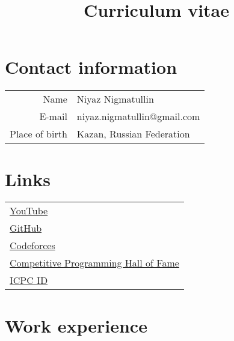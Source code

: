 \documentclass[11pt,a4paper,oneside]{article}
\begin{document}
\title{Curriculum vitae}
\date{}        
\maketitle

\section{Contact information}
\begin{center}
\begin{tabular}{r|l}
    Name&Niyaz Nigmatullin \\
    E-mail&niyaz.nigmatullin@gmail.com \\
    Place of birth&Kazan, Russian Federation \\
\end{tabular}
\end{center}

\section{Links}
\begin{center}
    \begin{tabular}{l}
        \href{https://www.youtube.com/c/NiyazNigmatullin}{YouTube} \\
        \href{https://github.com/niyaznigmatullin/}{GitHub} \\
        \href{https://codeforces.com/profile/niyaznigmatul}{Codeforces} \\
        \href{https://cphof.org/profile/topcoder:niyaznigmatul}{Competitive Programming Hall of Fame} \\
        \href{https://icpc.global/ICPCID/ZADFZYP7ZPVE}{ICPC ID} \\
    \end{tabular}
\end{center}

\section{Work experience}
\end{document}
